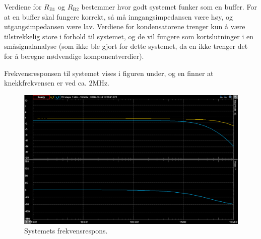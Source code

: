 Verdiene for $R_{\text{B}1}$ og $R_{\text{B}2}$ bestemmer hvor godt systemet funker som en buffer. For at en buffer skal fungere korrekt, så må inngangsimpedansen være høy, og utgangsimpedansen være lav. Verdiene for kondensatorene trenger kun å være tilstrekkelig store i forhold til systemet, og de vil fungere som kortslutninger i en småsignalanalyse (som ikke ble gjort for dette systemet, da en ikke trenger det for å beregne nødvendige komponentverdier).


Frekvensresponsen til systemet vises i figuren under, og en finner at knekkfrekvensen er ved ca. $2\text{MHz}$.

\vspace{1cm}
\begin{figure}[!h]
    \centering
    \includegraphics[width=1\textwidth]{img/frekvens-d5.png}
    \caption{Systemets frekvensrespons.}
    \label{fig:f}
\end{figure}
\vspace{1cm}
